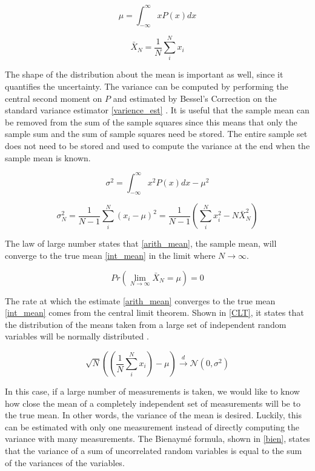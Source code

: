 \begin{equation}
\label{int_mean}
\mu = \int_{-\infty}^{\infty} x P(x) dx
\end{equation}

\begin{equation}
\label{arith_mean}
\bar{X}_N = \frac{1}{N} \sum_i^N x_i
\end{equation}

The shape of the distribution about the mean is important as well, since it quantifies the uncertainty.  The variance can be computed by performing the central second moment on $P$ and estimated by Bessel's Correction on the standard variance estimator \eqref{varience_est} \cite{openmc}.  It is useful that the sample mean can be removed from the sum of the sample squares since this means that only the sample sum and the sum of sample squares need be stored.  The entire sample set does not need to be stored and used to compute the variance at the end when the sample mean is known.

\begin{equation}
\label{varience}
\sigma^2 = \int_{-\infty}^{\infty} x^2 P(x) dx- \mu^2
\end{equation}

\begin{equation}
\label{varience_est}
\sigma_N^2 =  \frac{1}{N-1} \sum_i^N (x_i-\mu)^2 =  \frac{1}{N-1} \left( \sum_i^N x_i^2-N\bar{X}_N^2 \right)
\end{equation}

The law of large number states that \eqref{arith_mean}, the sample mean, will converge to the true mean \eqref{int_mean} in the limit where $N\rightarrow\infty$.  

\begin{equation}
\label{LLN}
Pr\left(\lim_{N\rightarrow\infty} \bar{X}_N = \mu \right) =0
\end{equation}

The rate at which the estimate \eqref{arith_mean} converges to the true mean \eqref{int_mean} comes from the central limit theorem.  Shown in \eqref{CLT}, it states that the distribution of the means taken from a large set of independent random variables will be normally distributed \cite{openmc}.  

\begin{equation}
\label{CLT}
\sqrt{N}\left(\left(\frac{1}{N} \sum_i^N x_i \right)-\mu\right) \xrightarrow[]{d} \mathcal{N}(0,\sigma^2)
\end{equation}

In this case, if a large number of measurements is taken, we would like to know how close the mean of a completely independent set of measurements will be to the true mean.  In other words, the variance of the mean is desired.  Luckily, this can be estimated with only one measurement instead of directly computing the variance with many measurements.  The Bienaym\'e formula, shown in \eqref{bien}, states that the variance of a sum of uncorrelated random variables is equal to the sum of the variances of the variables.

